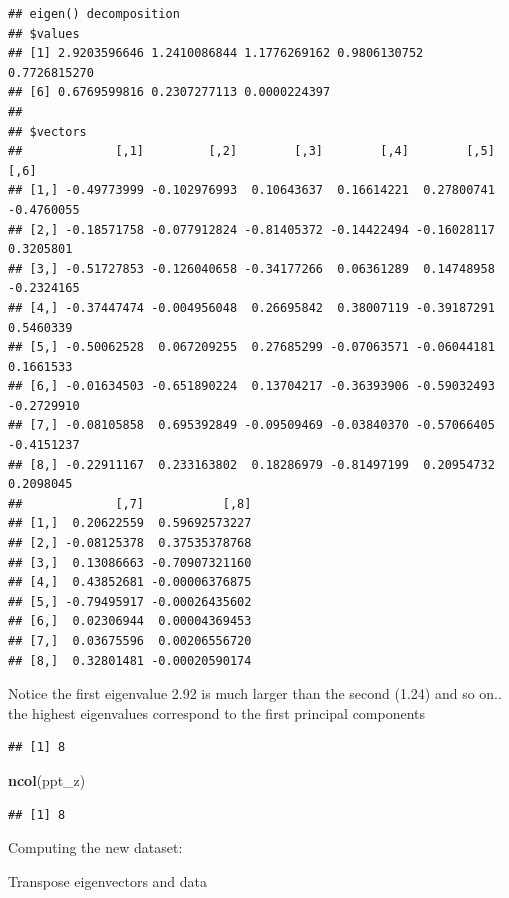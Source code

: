 \documentclass[]{article}
\newenvironment{Shaded}{\begin{snugshade}}{\end{snugshade}}
\newcommand{\KeywordTok}[1]{\textcolor[rgb]{0.13,0.29,0.53}{\textbf{#1}}}
\newcommand{\NormalTok}[1]{#1}
\newcommand{\OperatorTok}[1]{\textcolor[rgb]{0.81,0.36,0.00}{\textbf{#1}}}
\begin{document}
\begin{verbatim}
## eigen() decomposition
## $values
## [1] 2.9203596646 1.2410086844 1.1776269162 0.9806130752 0.7726815270
## [6] 0.6769599816 0.2307277113 0.0000224397
## 
## $vectors
##             [,1]         [,2]        [,3]        [,4]        [,5]       [,6]
## [1,] -0.49773999 -0.102976993  0.10643637  0.16614221  0.27800741 -0.4760055
## [2,] -0.18571758 -0.077912824 -0.81405372 -0.14422494 -0.16028117  0.3205801
## [3,] -0.51727853 -0.126040658 -0.34177266  0.06361289  0.14748958 -0.2324165
## [4,] -0.37447474 -0.004956048  0.26695842  0.38007119 -0.39187291  0.5460339
## [5,] -0.50062528  0.067209255  0.27685299 -0.07063571 -0.06044181  0.1661533
## [6,] -0.01634503 -0.651890224  0.13704217 -0.36393906 -0.59032493 -0.2729910
## [7,] -0.08105858  0.695392849 -0.09509469 -0.03840370 -0.57066405 -0.4151237
## [8,] -0.22911167  0.233163802  0.18286979 -0.81497199  0.20954732  0.2098045
##             [,7]           [,8]
## [1,]  0.20622559  0.59692573227
## [2,] -0.08125378  0.37535378768
## [3,]  0.13086663 -0.70907321160
## [4,]  0.43852681 -0.00006376875
## [5,] -0.79495917 -0.00026435602
## [6,]  0.02306944  0.00004369453
## [7,]  0.03675596  0.00206556720
## [8,]  0.32801481 -0.00020590174
\end{verbatim}

Notice the first eigenvalue 2.92 is much larger than the second (1.24)
and so on.. the highest eigenvalues correspond to the first principal
components

\begin{Shaded}
\end{Shaded}

\begin{verbatim}
## [1] 8
\end{verbatim}

\begin{Shaded}
\begin{Highlighting}[]
\KeywordTok{ncol}\NormalTok{(ppt_z)}
\end{Highlighting}
\end{Shaded}

\begin{verbatim}
## [1] 8
\end{verbatim}

Computing the new dataset:

Transpose eigenvectors and data
\end{document}
